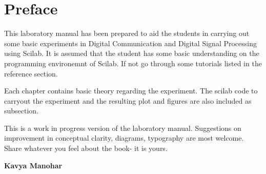 \chapter*{Preface} 

This laboratory manual has been prepared to aid the students in carrying out some basic experiments in Digital Communication and Digital Signal Processing using Scilab. It is assumed that the student has some basic understanding on the programming environemnt of Scilab. If not go through some tutorials listed in the reference section.

Each chapter contains basic theory regarding the experiment. The scilab code to carryout the experiment and the resulting plot and figures are also included as subsection. 

This is a work in progress version of the laboratory manual. Suggestions on improvement in conceptual clarity, diagrams, typography are most welcome. Share whatever you feel about the book- it is yours.

\begin{flushright}
\textbf{Kavya Manohar}
\end{flushright}